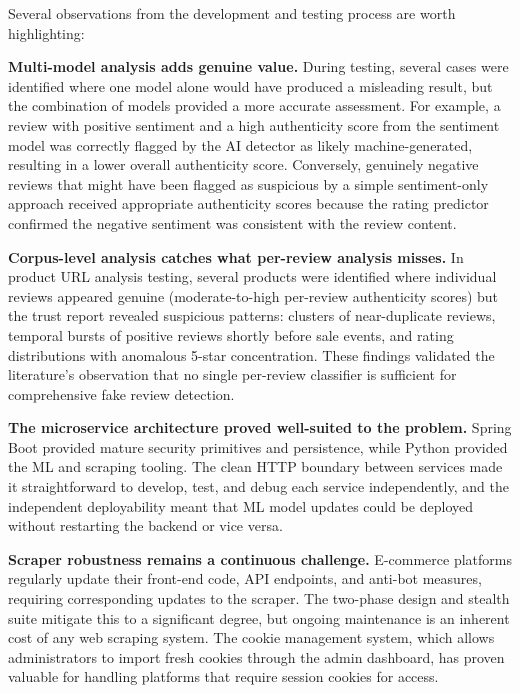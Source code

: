 \documentclass[12pt,a4paper,oneside]{report}
\begin{document}
Several observations from the development and testing process are worth
highlighting:

\textbf{Multi-model analysis adds genuine value.} During testing, several
cases were identified where one model alone would have produced a
misleading result, but the combination of models provided a more accurate
assessment. For example, a review with positive sentiment and a high
authenticity score from the sentiment model was correctly flagged by the
AI detector as likely machine-generated, resulting in a lower overall
authenticity score. Conversely, genuinely negative reviews that might have
been flagged as suspicious by a simple sentiment-only approach received
appropriate authenticity scores because the rating predictor confirmed the
negative sentiment was consistent with the review content.

\textbf{Corpus-level analysis catches what per-review analysis misses.}
In product URL analysis testing, several products were identified where
individual reviews appeared genuine (moderate-to-high per-review
authenticity scores) but the trust report revealed suspicious patterns:
clusters of near-duplicate reviews, temporal bursts of positive reviews
shortly before sale events, and rating distributions with anomalous
5-star concentration. These findings validated the literature's
observation that no single per-review classifier is sufficient for
comprehensive fake review detection.

\textbf{The microservice architecture proved well-suited to the problem.}
Spring Boot provided mature security primitives and persistence, while
Python provided the ML and scraping tooling. The clean HTTP boundary
between services made it straightforward to develop, test, and debug each
service independently, and the independent deployability meant that ML
model updates could be deployed without restarting the backend or
vice versa.

\textbf{Scraper robustness remains a continuous challenge.} E-commerce
platforms regularly update their front-end code, API endpoints, and
anti-bot measures, requiring corresponding updates to the scraper. The
two-phase design and stealth suite mitigate this to a significant degree,
but ongoing maintenance is an inherent cost of any web scraping system.
The cookie management system, which allows administrators to import
fresh cookies through the admin dashboard, has proven valuable for
handling platforms that require session cookies for access.

\end{document}
